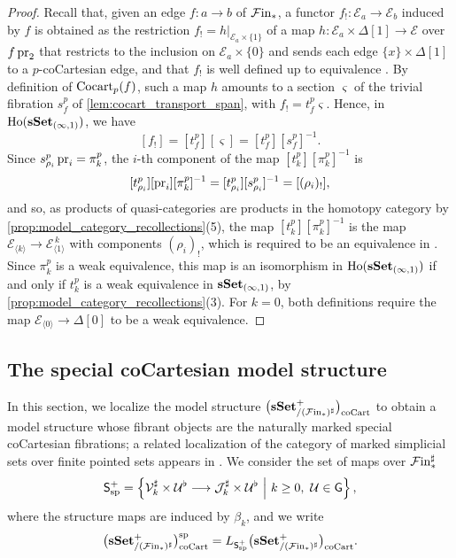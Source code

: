 \documentclass[10pt,reqno]{amsart}
\begin{document}
\begin{proof}
Recall that, given an edge $f:a\to b$ of $\mathcal{F}\mathrm{in}_*$, a functor
$f_!:\mathcal E_a\to\mathcal E_b$ induced by $f$ is obtained as
the restriction $f_!=h|_{\mathcal E_a\times\{1\}}$ of a map
$h:\mathcal E_a\times\Delta[1]\to\mathcal E$ over $f\operatorname{pr}_2$ that
restricts to the inclusion on $\mathcal E_a\times\{0\}$ and sends
each edge $\{x\}\times\Delta[1]$ to a $p$-coCartesian edge, and
that $f_!$ is well defined up to equivalence
\cite[\S5.2.1]{lurie2009higher}. By definition of $\operatorname{Cocart}_p(f)$,
such a map $h$ amounts to a section $\varsigma$ of the trivial
fibration $s_f^p$ of \cref{lem:cocart_transport_span}, with
$f_!=t_f^p\varsigma$. Hence, in $\operatorname{Ho}(\mathbf{sSet}_{(\infty,1)})$, we have
\[
[f_!]=[t_f^p][\varsigma]=[t_f^p][s_f^p]^{-1}.
\]
Since $s_{\rho_i}^p\operatorname{pr}_i=\pi_k^p$, the $i$-th component of the map
$[t_k^p][\pi_k^p]^{-1}$ is
\[
[t_{\rho_i}^p][\operatorname{pr}_i][\pi_k^p]^{-1}
=[t_{\rho_i}^p][s_{\rho_i}^p]^{-1}=[(\rho_i)_!],
\]
and so, as products of quasi-categories are products in the homotopy
category by \cref{prop:model_category_recollections}(5), the map
$[t_k^p][\pi_k^p]^{-1}$ is the map
$\mathcal E_{\langle k\rangle}\to\mathcal E_{\langle1\rangle}^{\,k}$
with components $(\rho_i)_!$, which is required to be an equivalence
in \cite[Definition~2.0.0.7]{LurieHA}. Since $\pi_k^p$ is a weak
equivalence, this map is an isomorphism in
$\operatorname{Ho}(\mathbf{sSet}_{(\infty,1)})$ if and only if $t_k^p$ is a weak
equivalence in $\mathbf{sSet}_{(\infty,1)}$, by
\cref{prop:model_category_recollections}(3). For $k=0$, both
definitions require the map
$\mathcal E_{\langle0\rangle}\to\Delta[0]$ to be a weak equivalence.
\end{proof}

\subsection{The special coCartesian model structure}
\label{subsec:enriched_special_model_structure}

In this section, we localize the model structure $\bigl(\mathbf{sSet}^+_{/(\mathcal{F}\mathrm{in}_*)^\sharp}\bigr)_{\mathrm{coCart}}$ to obtain
a model structure whose fibrant objects are the naturally marked
special coCartesian fibrations; a related localization of the category
of marked simplicial sets over finite pointed sets appears in
\cite[\S8]{Sharma2021}. We consider the set of maps over
$\mathcal{F}\mathrm{in}_*^\sharp$
\begin{equation}
\label{eq:enriched_special_localizers}
\mathsf S_{\mathrm{sp}}^+
=\left\{
\mathcal V_k^\sharp\times\mathcal U^\flat
\longrightarrow\mathcal J_k^\sharp\times\mathcal U^\flat
\ \middle|\ k\geq0,\ \mathcal U\in\mathsf G
\right\},
\end{equation}
where the structure maps are induced by $\beta_k$, and we write
\[
\bigl(\mathbf{sSet}^+_{/(\mathcal{F}\mathrm{in}_*)^\sharp}\bigr)_{\mathrm{coCart}}^{\mathrm{sp}}=L_{\mathsf S_{\mathrm{sp}}^+}\bigl(\mathbf{sSet}^+_{/(\mathcal{F}\mathrm{in}_*)^\sharp}\bigr)_{\mathrm{coCart}}.
\]
\end{document}
